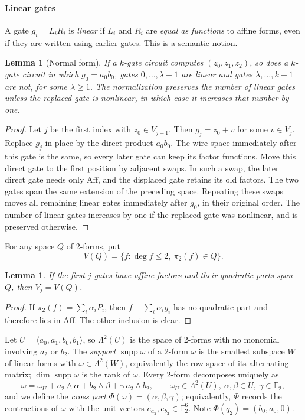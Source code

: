 \documentclass[11pt,a4paper]{article}
\theoremstyle{plain}
\newtheorem{lemma}[theorem]{Lemma}
\theoremstyle{remark}
\theoremstyle{plain}
\newcommand{\F}{\mathbb F_2}
\newcommand{\Aff}{\mathrm{Aff}}
\newcommand{\supp}{\operatorname{supp}}
\newcommand{\Lam}{\Lambda^2}
\begin{document}
\paragraph{Linear gates}
A gate $g_i=L_iR_i$ is \emph{linear} if $L_i$ and $R_i$ are \emph{equal as functions} to affine forms, even if they are written using earlier gates. This is a semantic notion.

\begin{lemma}[Normal form]\label{l4:lem:normal}
If a $k$-gate circuit computes $(z_0,z_1,z_2)$, so does a $k$-gate circuit in which $g_0=a_0b_0$, gates $0,\dots,\lambda-1$ are linear and gates $\lambda,\dots,k-1$ are not, for some $\lambda\ge1$.
The normalization preserves the number of linear gates unless the replaced gate is nonlinear, in which case it increases that number by one.
\end{lemma}

\begin{proof}
Let $j$ be the first index with $z_0\in V_{j+1}$. Then $g_j=z_0+v$ for some $v\in V_j$. Replace $g_j$ in place by the direct product $a_0b_0$. The wire space immediately after this gate is the same, so every later gate can keep its factor functions. Move this direct gate to the first position by adjacent swaps. In such a swap, the later direct gate needs only $\Aff$, and the displaced gate retains its old factors. The two gates span the same extension of the preceding space. Repeating these swaps moves all remaining linear gates immediately after $g_0$, in their original order. The number of linear gates increases by one if the replaced gate was nonlinear, and is preserved otherwise.
\end{proof}

For any space $Q$ of 2-forms, put
\[
 V(Q)=\{f:\deg f\le2,\ \pi_2(f)\in Q\}.
\]
\begin{lemma}\label{l4:lem:Qonly}
If the first $j$ gates have affine factors and their quadratic parts span $Q$, then $V_j=V(Q)$.
\end{lemma}

\begin{proof}
If $\pi_2(f)=\sum_i\alpha_iP_i$, then $f-\sum_i\alpha_ig_i$ has no quadratic part and therefore lies in $\Aff$. The other inclusion is clear.
\end{proof}


Let $U=\langle a_0,a_1,b_0,b_1\rangle$, so $\Lam(U)$ is the space of 2-forms with no monomial involving $a_2$ or $b_2$. The \emph{support} $\supp\omega$ of a 2-form $\omega$ is the smallest subspace $W$ of linear forms with $\omega\in\Lam(W)$, equivalently the row space of its alternating matrix; $\dim\supp\omega$ is the rank of $\omega$. Every 2-form decomposes uniquely as
\[
  \omega=\omega_U+a_2\wedge\alpha+b_2\wedge\beta+\gamma\,a_2\wedge b_2,\qquad \omega_U\in\Lam(U),\ \alpha,\beta\in U,\ \gamma\in\F,
\]
and we define the \emph{cross part} $\Phi(\omega)=(\alpha,\beta,\gamma)$; equivalently, $\Phi$ records the contractions of $\omega$ with the unit vectors $e_{a_2},e_{b_2}\in\F^6$. Note $\Phi(q_2)=(b_0,a_0,0)$.
\end{document}
